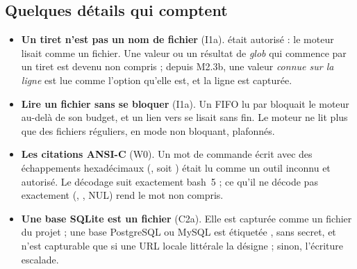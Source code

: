 \subsection{Quelques détails qui comptent}
\begin{itemize}
  \item \textbf{Un tiret n'est pas un nom de fichier} (I1a).  était
    autorisé : le moteur lisait  comme un fichier. Une valeur ou un résultat de
    \textit{glob} qui commence par un tiret est devenu non compris ; depuis M2.3b, une valeur
    \emph{connue sur la ligne} est lue comme l'option qu'elle est, et la ligne est capturée.
  \item \textbf{Lire un fichier sans se bloquer} (I1a). Un FIFO lu par 
    bloquait le moteur au-delà de son budget, et un lien vers  se lisait sans
    fin. Le moteur ne lit plus que des fichiers réguliers, en mode non bloquant, plafonnés.
  \item \textbf{Les citations ANSI-C} (W0). Un mot de commande écrit avec des échappements
    hexadécimaux (, soit ) était lu comme
    un outil inconnu et autorisé. Le décodage suit exactement bash~5 ; ce qu'il ne décode pas
    exactement (, , NUL) rend le mot non compris.
  \item \textbf{Une base SQLite est un fichier} (C2a). Elle est capturée comme un fichier du
    projet ; une base PostgreSQL ou MySQL est étiquetée , sans secret, et
    n'est capturable que si une URL locale littérale la désigne ; sinon, l'écriture escalade.
\end{itemize}
